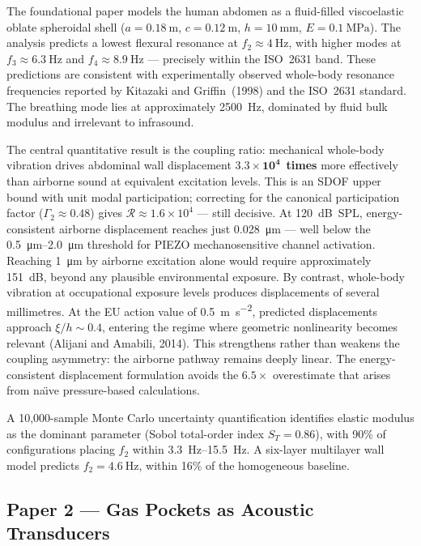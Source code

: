 \documentclass[11pt,a4paper]{article}
\begin{document}
The foundational paper models the human abdomen as a fluid-filled viscoelastic oblate spheroidal shell ($a = \SI{0.18}{\m}$, $c = \SI{0.12}{\m}$, $h = \SI{10}{\mm}$, $E = \SI{0.1}{\MPa}$). The analysis predicts a lowest flexural resonance at $f_2 \approx \SI{4}{\Hz}$, with higher modes at $f_3 \approx \SI{6.3}{\Hz}$ and $f_4 \approx \SI{8.9}{\Hz}$ --- precisely within the ISO~2631 band. These predictions are consistent with experimentally observed whole-body resonance frequencies reported by Kitazaki and Griffin~(1998) and the ISO~2631 standard. The breathing mode lies at approximately \SI{2500}{\Hz}, dominated by fluid bulk modulus and irrelevant to infrasound.

The central quantitative result is the coupling ratio: mechanical whole-body vibration drives abdominal wall displacement $\mathbf{3.3 \times 10^4}$~\textbf{times} more effectively than airborne sound at equivalent excitation levels. This is an SDOF upper bound with unit modal participation; correcting for the canonical participation factor ($\Gamma_2 \approx 0.48$) gives $\mathcal{R} \approx 1.6 \times 10^4$ --- still decisive. At \SI{120}{\dB}~SPL, energy-consistent airborne displacement reaches just \SI{0.028}{\micro\m} --- well below the \SIrange{0.5}{2.0}{\micro\m} threshold for PIEZO mechanosensitive channel activation. Reaching \SI{1}{\micro\m} by airborne excitation alone would require approximately \SI{151}{\dB}, beyond any plausible environmental exposure. By contrast, whole-body vibration at occupational exposure levels produces displacements of several millimetres. At the EU action value of \SI{0.5}{\metre\per\second\squared}, predicted displacements approach $\xi/h \sim 0.4$, entering the regime where geometric nonlinearity becomes relevant (Alijani and Amabili, 2014). This strengthens rather than weakens the coupling asymmetry: the airborne pathway remains deeply linear. The energy-consistent displacement formulation avoids the $6.5\times$ overestimate that arises from na\"{\i}ve pressure-based calculations.

A 10{,}000-sample Monte Carlo uncertainty quantification identifies elastic modulus as the dominant parameter (Sobol total-order index $S_T = 0.86$), with 90\% of configurations placing $f_2$ within \SIrange{3.3}{15.5}{\Hz}. A six-layer multilayer wall model predicts $f_2 = \SI{4.6}{\Hz}$, within 16\% of the homogeneous baseline.

\subsection{Paper 2 --- Gas Pockets as Acoustic Transducers}
\end{document}
